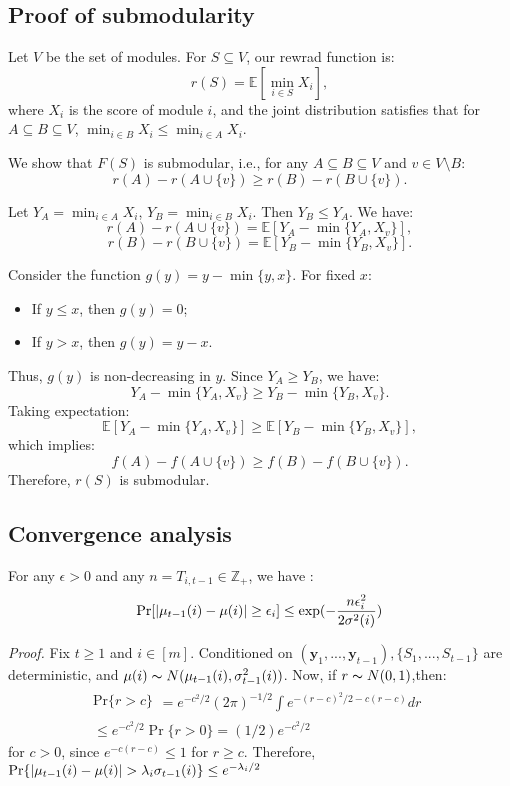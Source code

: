 \documentclass[opre,sglanonrev]{informs4}
\begin{document}
\subsection{Proof of submodularity}
Let $V$ be the set of modules. For $S \subseteq V$, our rewrad function is:
\[
r(S) = \mathbb{E}\left[\min_{i \in S} X_i\right],
\]
where $X_i$ is the score of module $i$, and the joint distribution satisfies that for $A \subseteq B \subseteq V$, $\min_{i \in B} X_i \leq \min_{i \in A} X_i$.

We show that $F(S)$ is submodular, i.e., for any $A \subseteq B \subseteq V$ and $v \in V \setminus B$:
\[
r(A) - r(A \cup \{v\}) \geq r(B) - r(B \cup \{v\}).
\]

Let $Y_A = \min_{i \in A} X_i$, $Y_B = \min_{i \in B} X_i$. Then $Y_B \leq Y_A$. We have:
\[
r(A) - r(A \cup \{v\}) = \mathbb{E}\left[Y_A - \min\{Y_A, X_v\}\right],
\]
\[
r(B) - r(B \cup \{v\}) = \mathbb{E}\left[Y_B - \min\{Y_B, X_v\}\right].
\]

Consider the function $g(y) = y - \min\{y, x\}$. For fixed $x$:
\begin{itemize}
    \item If $y \leq x$, then $g(y) = 0$;
    \item If $y > x$, then $g(y) = y - x$.
\end{itemize}
Thus, $g(y)$ is non-decreasing in $y$. Since $Y_A \geq Y_B$, we have:
\[
Y_A - \min\{Y_A, X_v\} \geq Y_B - \min\{Y_B, X_v\}.
\]
Taking expectation:
\[
\mathbb{E}\left[Y_A - \min\{Y_A, X_v\}\right] \geq \mathbb{E}\left[Y_B - \min\{Y_B, X_v\}\right],
\]
which implies:
\[
f(A) - f(A \cup \{v\}) \geq f(B) - f(B \cup \{v\}).
\]
Therefore, $r(S)$ is submodular.

\subsection{Convergence analysis}
\begin{lemma}
For any $\epsilon > 0$ and any $n = T_{i,t-1} \in \mathbb{Z}_+$, we have :
$$
\textnormal{Pr}[|\mu_{t-1}(i)-\mu(i)|\geq \epsilon_i]\leq \exp(-\frac{n\epsilon_i^2}{2\sigma^2(i)})
$$
\end{lemma} 
\textit{Proof.} Fix $t\geq 1$ and $i\in [m]$. Conditioned on $(\mathbf{y}_1,...,\mathbf{y}_{t-1}), \{S_1,...,S_{t-1}\}$ are deterministic, and $\mu(i)\thicksim N(\mu_{t-1}(i),\sigma_{t-1}^2(i))$. Now, if $r\thicksim N(0,1)$,then: 
$$\begin{gathered}
\mathrm{Pr}\{r>c\}
\begin{aligned}
=e^{-c^2/2}(2\pi)^{-1/2}\int e^{-(r-c)^2/2-c(r-c)}dr
\end{aligned} \\
\leq e^{-c^2/2}\Pr\{r>0\}=(1/2)e^{-c^2/2}
\end{gathered}$$
for $c>0$, since $e^{-c(r-c)}\leq 1$ for $r\geq c$. Therefore, $\textnormal{Pr}\{|\mu_{t-1}(i)-\mu(i)|>\lambda_i \sigma_{t-1}(i)\}\leq e^{-\lambda_i/2}$
\end{document}
